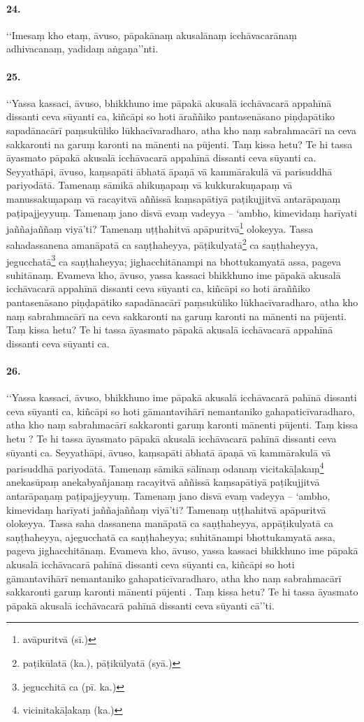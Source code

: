 \paragraph{24.} ‘‘Imesaṃ kho etaṃ, āvuso, pāpakānaṃ akusalānaṃ icchāvacarānaṃ adhivacanaṃ, yadidaṃ aṅgaṇa’’nti.

\paragraph{25.} ‘‘Yassa kassaci, āvuso, bhikkhuno ime pāpakā akusalā icchāvacarā appahīnā dissanti ceva sūyanti ca, kiñcāpi so hoti āraññiko pantasenāsano piṇḍapātiko sapadānacārī paṃsukūliko lūkhacīvaradharo, atha kho naṃ sabrahmacārī na ceva sakkaronti na garuṃ karonti na mānenti na pūjenti. Taṃ kissa hetu? Te hi tassa āyasmato pāpakā akusalā icchāvacarā appahīnā dissanti ceva sūyanti ca. Seyyathāpi, āvuso, kaṃsapāti ābhatā āpaṇā vā kammārakulā vā parisuddhā pariyodātā. Tamenaṃ sāmikā ahikuṇapaṃ vā kukkurakuṇapaṃ vā manussakuṇapaṃ vā racayitvā aññissā kaṃsapātiyā paṭikujjitvā antarāpaṇaṃ paṭipajjeyyuṃ. Tamenaṃ jano disvā evaṃ vadeyya – ‘ambho, kimevidaṃ harīyati jaññajaññaṃ viyā’ti? Tamenaṃ uṭṭhahitvā apāpuritvā\footnote{avāpuritvā (sī.)} olokeyya. Tassa sahadassanena amanāpatā ca saṇṭhaheyya, pāṭikulyatā\footnote{paṭikūlatā (ka.), pāṭikūlyatā (syā.)} ca saṇṭhaheyya, jegucchatā\footnote{jegucchitā ca (pī. ka.)} ca saṇṭhaheyya; jighacchitānampi na bhottukamyatā assa, pageva suhitānaṃ. Evameva kho, āvuso, yassa kassaci bhikkhuno ime pāpakā akusalā icchāvacarā appahīnā dissanti ceva sūyanti ca, kiñcāpi so hoti āraññiko pantasenāsano piṇḍapātiko sapadānacārī paṃsukūliko lūkhacīvaradharo, atha kho naṃ sabrahmacārī na ceva sakkaronti na garuṃ karonti na mānenti na pūjenti. Taṃ kissa hetu? Te hi tassa āyasmato pāpakā akusalā icchāvacarā appahīnā dissanti ceva sūyanti ca.

\paragraph{26.} ‘‘Yassa kassaci, āvuso, bhikkhuno ime pāpakā akusalā icchāvacarā pahīnā dissanti ceva sūyanti ca, kiñcāpi so hoti gāmantavihārī nemantaniko gahapaticīvaradharo, atha kho naṃ sabrahmacārī sakkaronti garuṃ karonti mānenti pūjenti. Taṃ kissa hetu ? Te hi tassa āyasmato pāpakā akusalā icchāvacarā pahīnā dissanti ceva sūyanti ca. Seyyathāpi, āvuso, kaṃsapāti ābhatā āpaṇā vā kammārakulā vā parisuddhā pariyodātā. Tamenaṃ sāmikā sālīnaṃ odanaṃ vicitakāḷakaṃ\footnote{vicinitakāḷakaṃ (ka.)} anekasūpaṃ anekabyañjanaṃ racayitvā aññissā kaṃsapātiyā paṭikujjitvā antarāpaṇaṃ paṭipajjeyyuṃ. Tamenaṃ jano disvā evaṃ vadeyya – ‘ambho, kimevidaṃ harīyati jaññajaññaṃ viyā’ti? Tamenaṃ uṭṭhahitvā apāpuritvā olokeyya. Tassa saha dassanena manāpatā ca saṇṭhaheyya, appāṭikulyatā ca saṇṭhaheyya, ajegucchatā ca saṇṭhaheyya; suhitānampi bhottukamyatā assa, pageva jighacchitānaṃ. Evameva kho, āvuso, yassa kassaci bhikkhuno ime pāpakā akusalā icchāvacarā pahīnā dissanti ceva sūyanti ca, kiñcāpi so hoti gāmantavihārī nemantaniko gahapaticīvaradharo, atha kho naṃ sabrahmacārī sakkaronti garuṃ karonti mānenti pūjenti . Taṃ kissa hetu? Te hi tassa āyasmato pāpakā akusalā icchāvacarā pahīnā dissanti ceva sūyanti cā’’ti.


